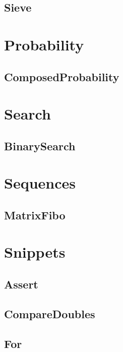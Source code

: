 \subsection{ Sieve}
\raggedbottom
\hrulefill

\section{Probability}
\subsection{ ComposedProbability}
\raggedbottom
\hrulefill

\section{Search}
\subsection{ BinarySearch}
\raggedbottom
\hrulefill

\section{Sequences}
\subsection{ MatrixFibo}
\raggedbottom
\hrulefill

\section{Snippets}
\subsection{ Assert}
\raggedbottom
\hrulefill
\subsection{ CompareDoubles}
\raggedbottom
\hrulefill
\subsection{ For}
\raggedbottom
\hrulefill
